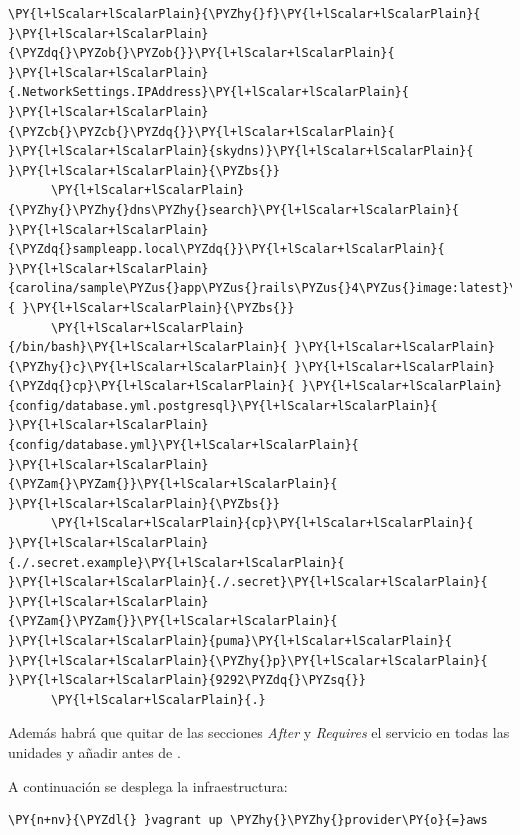 \begin{codelisting}
\begin{Verbatim}[fontsize=\relsize{-2.5},fontseries=b,commandchars=\\\{\}]
      \PY{l+lScalar+lScalarPlain}{\PYZhy{}f}\PY{l+lScalar+lScalarPlain}{ }\PY{l+lScalar+lScalarPlain}{\PYZdq{}\PYZob{}\PYZob{}}\PY{l+lScalar+lScalarPlain}{ }\PY{l+lScalar+lScalarPlain}{.NetworkSettings.IPAddress}\PY{l+lScalar+lScalarPlain}{ }\PY{l+lScalar+lScalarPlain}{\PYZcb{}\PYZcb{}\PYZdq{}}\PY{l+lScalar+lScalarPlain}{ }\PY{l+lScalar+lScalarPlain}{skydns)}\PY{l+lScalar+lScalarPlain}{ }\PY{l+lScalar+lScalarPlain}{\PYZbs{}}
      \PY{l+lScalar+lScalarPlain}{\PYZhy{}\PYZhy{}dns\PYZhy{}search}\PY{l+lScalar+lScalarPlain}{ }\PY{l+lScalar+lScalarPlain}{\PYZdq{}sampleapp.local\PYZdq{}}\PY{l+lScalar+lScalarPlain}{ }\PY{l+lScalar+lScalarPlain}{carolina/sample\PYZus{}app\PYZus{}rails\PYZus{}4\PYZus{}image:latest}\PY{l+lScalar+lScalarPlain}{ }\PY{l+lScalar+lScalarPlain}{\PYZbs{}}
      \PY{l+lScalar+lScalarPlain}{/bin/bash}\PY{l+lScalar+lScalarPlain}{ }\PY{l+lScalar+lScalarPlain}{\PYZhy{}c}\PY{l+lScalar+lScalarPlain}{ }\PY{l+lScalar+lScalarPlain}{\PYZdq{}cp}\PY{l+lScalar+lScalarPlain}{ }\PY{l+lScalar+lScalarPlain}{config/database.yml.postgresql}\PY{l+lScalar+lScalarPlain}{ }\PY{l+lScalar+lScalarPlain}{config/database.yml}\PY{l+lScalar+lScalarPlain}{ }\PY{l+lScalar+lScalarPlain}{\PYZam{}\PYZam{}}\PY{l+lScalar+lScalarPlain}{ }\PY{l+lScalar+lScalarPlain}{\PYZbs{}}
      \PY{l+lScalar+lScalarPlain}{cp}\PY{l+lScalar+lScalarPlain}{ }\PY{l+lScalar+lScalarPlain}{./.secret.example}\PY{l+lScalar+lScalarPlain}{ }\PY{l+lScalar+lScalarPlain}{./.secret}\PY{l+lScalar+lScalarPlain}{ }\PY{l+lScalar+lScalarPlain}{\PYZam{}\PYZam{}}\PY{l+lScalar+lScalarPlain}{ }\PY{l+lScalar+lScalarPlain}{puma}\PY{l+lScalar+lScalarPlain}{ }\PY{l+lScalar+lScalarPlain}{\PYZhy{}p}\PY{l+lScalar+lScalarPlain}{ }\PY{l+lScalar+lScalarPlain}{9292\PYZdq{}\PYZsq{}}
      \PY{l+lScalar+lScalarPlain}{.}
\end{Verbatim}
\end{codelisting}

Además habrá que quitar de las secciones \textit{After} y \textit{Requires} el servicio  en todas las unidades y añadir  antes de .

A continuación se desplega la infraestructura:

\begin{framed_shaded}
\begin{Verbatim}[fontsize=\relsize{-2.5},fontseries=b,commandchars=\\\{\}]
\PY{n+nv}{\PYZdl{} }vagrant up \PYZhy{}\PYZhy{}provider\PY{o}{=}aws
\end{Verbatim}
\end{framed_shaded}

